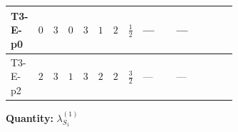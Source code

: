 \documentclass[8pt]{article}
\begin{document}
\begin{landscape}
\begin{longtable}{@{}llcccccc >{\raggedright\arraybackslash}p{0.21\linewidth} >{\raggedright\arraybackslash}p{0.21\linewidth} >{\raggedright\arraybackslash}p{0.21\linewidth}@{}}
\midrule
T3-E-p0 & $0$ & $3$ & $0$ & $3$ & $1$ & $2$ & $\frac{1}{2}$ & --- & --- & \scriptsize\adjustbox{max width=\linewidth}{$\begin{gathered} {\lambda_{S_1}^{(1)}} (4 T_{\nu}^{(1)}+14 {\lambda_{S_1}^{(A)}})\end{gathered}$} \\
\midrule
T3-E-p2 & $2$ & $3$ & $1$ & $3$ & $2$ & $2$ & $\frac{3}{2}$ & --- & --- & \scriptsize\adjustbox{max width=\linewidth}{$\begin{gathered} {\lambda_{S_1}^{(1)}} (4 T_{\nu}^{(1)}+14 {\lambda_{S_1}^{(A)}})\end{gathered}$} \\
\midrule
\bottomrule
\end{longtable}
\clearpage
\noindent\textbf{Quantity: }$\lambda_{S_1}^{(1)}$\par\smallskip

\end{landscape}
\end{document}
